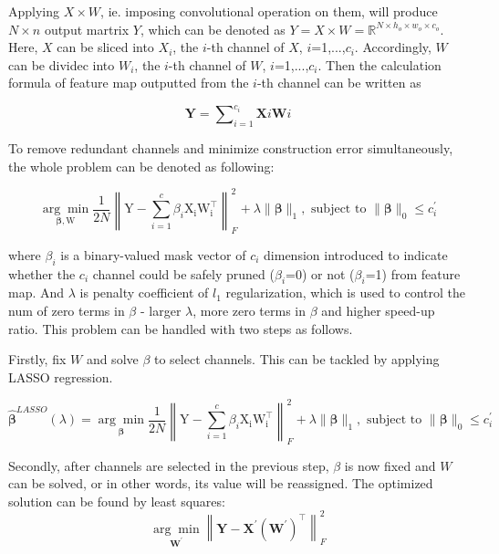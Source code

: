\documentclass[sigconf]{acmart}
\begin{document}
Applying $X\times W$, ie. imposing convolutional operation on them, will produce $N\times n$ output martrix $Y$, which can be denoted as ${Y} ={X} \times {W} = \mathbb{R}^{N \times h_{o} \times w_{o} \times c_{o}}$. Here, ${X}$ can be sliced into ${X_i}$, the $i$-th channel of ${X}$, ${i}$=1,...,${c_i}$. Accordingly, ${W}$ can be dividec into ${W_i}$, the $i$-th channel of ${W}$, ${i}$=1,...,${c_i}$. Then the calculation formula of feature map outputted from the $i$-th channel can be written as 

\begin{equation}
\mathbf{Y} = \sum\nolimits_{i = 1}^{c_{i}} \mathbf{X}{i} \mathbf{W}{i}
\end{equation}

To remove redundant channels and minimize construction error simultaneously, the whole problem can be denoted as following: 

\begin{equation}
\underset{\boldsymbol{\beta}, \mathrm{W}}{\arg \min } \frac{1}{2 N}\left\|\mathrm{Y}-\sum_{i=1}^{c} \beta_{i} \mathrm{X}_{\mathrm{i}} \mathrm{W}_{\mathrm{i}}^{\top}\right\|_{F}^{2}+\lambda\|\boldsymbol{\beta}\|_{1}, \text { subject to }\|\boldsymbol{\beta}\|_{0} \leq c_i^{\prime}
\end{equation}

where ${\beta_i}$ is a binary-valued mask vector of ${c_i}$ dimension introduced to indicate whether the ${c_i}$ channel could be safely pruned (${\beta_i}$=0) or not (${\beta_i}$=1) from feature map. And ${\lambda}$ is penalty coefficient of ${l_1}$ regularization, which is used to control the num of zero terms in ${\beta}$ - larger ${\lambda}$, more zero terms in ${\beta}$ and higher speed-up ratio. This problem can be handled with two steps as follows.

Firstly, fix $W$ and solve $\beta$ to select channels. This can be tackled by applying LASSO regression.

\begin{equation}
\hat{\boldsymbol{\beta}}^{L A S S O}(\lambda)=\underset{\boldsymbol{\beta}}{\arg \min } \frac{1}{2 N}\left\|\mathrm{Y}-\sum_{i=1}^{c} \beta_{i} \mathrm{X}_{\mathrm{i}} \mathrm{W}_{\mathrm{i}}^{\top}\right\|_{F}^{2}+\lambda\|\boldsymbol{\beta}\|_{1}, \text { subject to }\|\boldsymbol{\beta}\|_{0} \leq c_i^{\prime}
\label{equ: equation1}
\end{equation}

Secondly, after channels are selected in the previous step, $\beta$ is now fixed and $W$ can be solved, or in other words, its value will be reassigned. The optimized solution can be found by least squares: 
\begin{equation}
\underset{\mathbf{W}^{\prime}}{\arg \min }\left\|\mathbf{Y}-\mathbf{X}^{\prime}\left(\mathbf{W}^{\prime}\right)^{\top}\right\|_{F}^{2}    
\end{equation}
\end{document}
